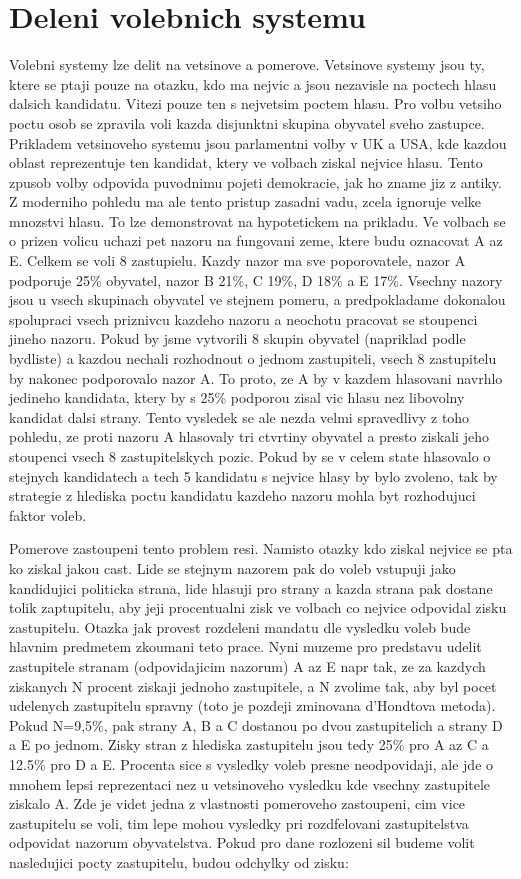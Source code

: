 \documentclass[12pt,a4paper]{report}
\begin{document}
\section{Deleni volebnich systemu}
Volebni systemy lze delit na vetsinove a pomerove. Vetsinove systemy jsou ty, ktere se ptaji pouze na otazku, kdo ma nejvic a jsou nezavisle na poctech hlasu dalsich kandidatu.
Vitezi pouze ten s nejvetsim poctem hlasu. Pro volbu vetsiho poctu osob se zpravila voli kazda disjunktni skupina obyvatel sveho zastupce. Prikladem vetsinoveho systemu jsou parlamentni volby v UK a USA, kde kazdou oblast reprezentuje ten kandidat, ktery ve volbach ziskal nejvice hlasu. Tento zpusob volby odpovida puvodnimu pojeti demokracie, jak ho zname jiz z antiky. 
Z moderniho pohledu ma ale tento pristup zasadni vadu, zcela ignoruje velke mnozstvi hlasu.
To lze demonstrovat na hypotetickem na prikladu. Ve volbach se o prizen volicu uchazi pet nazoru na fungovani zeme, ktere budu oznacovat A az E.
Celkem se voli 8 zastupielu.
Kazdy nazor ma sve poporovatele, nazor A podporuje 25\% obyvatel, nazor B 21\%, C 19\%, D 18\% a E 17\%.
Vsechny nazory jsou u vsech skupinach obyvatel ve stejnem pomeru, a predpokladame dokonalou spolupraci vsech priznivcu kazdeho nazoru a neochotu pracovat se stoupenci jineho nazoru.
Pokud by jsme vytvorili 8 skupin obyvatel (napriklad podle bydliste) a kazdou nechali rozhodnout o jednom zastupiteli, vsech 8 zastupitelu by nakonec podporovalo nazor A.
To proto, ze A by v kazdem hlasovani navrhlo jedineho kandidata, ktery by s 25\% podporou zisal vic hlasu nez libovolny kandidat dalsi strany. 
Tento vysledek se ale nezda velmi spravedlivy z toho pohledu, ze proti nazoru A hlasovaly tri ctvrtiny obyvatel a presto ziskali jeho stoupenci vsech 8 zastupitelskych pozic.
Pokud by se v celem state hlasovalo o stejnych kandidatech a tech 5 kandidatu s nejvice hlasy by bylo zvoleno, tak by strategie z hlediska poctu kandidatu kazdeho nazoru mohla byt rozhodujuci faktor voleb. 

Pomerove zastoupeni tento problem resi.
Namisto otazky kdo ziskal nejvice se pta ko ziskal jakou cast. Lide se stejnym nazorem pak do voleb vstupuji jako kandidujici politicka strana, lide hlasuji pro strany a kazda strana pak dostane tolik zaptupitelu, aby jeji procentualni zisk ve volbach co nejvice odpovidal zisku zastupitelu.
Otazka jak provest rozdeleni mandatu dle vysledku voleb bude hlavnim predmetem zkoumani teto prace.
Nyni muzeme pro predstavu udelit zastupitele stranam (odpovidajicim nazorum) A az E napr tak, ze za kazdych ziskanych N procent ziskaji jednoho zastupitele, a N zvolime tak, aby byl pocet udelenych zastupitelu spravny (toto je pozdeji zminovana d'Hondtova metoda).
Pokud N=9,5\%, pak strany A, B a C dostanou po dvou zastupitelich a strany D a E po jednom.
Zisky stran z hlediska zastupitelu jsou tedy 25\% pro A az C a 12.5\% pro D a E.
Procenta sice s vysledky voleb presne neodpovidaji, ale jde o mnohem lepsi reprezentaci nez u vetsinoveho vysledku kde vsechny zastupitele ziskalo A.
Zde je videt jedna z vlastnosti pomeroveho zastoupeni, cim vice zastupitelu se voli, tim lepe mohou vysledky pri rozdfelovani zastupitelstva odpovidat nazorum obyvatelstva.
Pokud pro dane rozlozeni sil budeme volit nasledujici pocty zastupitelu, budou odchylky od  zisku:
\end{document}
